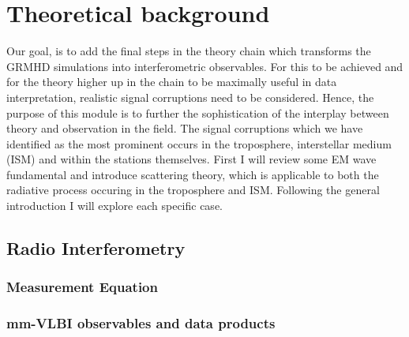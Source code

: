 \chapter{Theoretical background}
Our goal, is to add the final steps in the theory chain which transforms the GRMHD simulations into interferometric observables. For this to be achieved and for the theory higher up in the chain to be maximally useful in data interpretation, realistic signal corruptions need to be considered. Hence, the purpose of this module is to further the sophistication of the interplay between theory and observation in the field.
The signal corruptions which we have identified as the most prominent occurs in the troposphere, interstellar medium (ISM) and within the stations themselves. First I will review some EM wave fundamental and introduce scattering theory, which is applicable to both the radiative process occuring in the troposphere and ISM. Following the general introduction I will explore each specific case.

\section{Radio Interferometry}




\subsection{Measurement Equation}\label{sec:RIME}




\subsection{mm-VLBI observables and data products}

